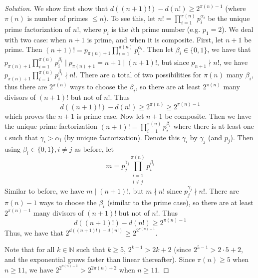 \documentclass{article}
\newcommand{\N}{{\mathbb N}}
\begin{document}
\begin{proof}[Solution]
	We show first show that $d((n+1)!) - d(n!) \geq 2^{\pi(n)-1}$
	(where $\pi(n)$ is number of primes $\leq n$).
	To see this, let $n! = \prod_{i=1}^{\pi(n)}p_i^{\alpha_i}$
	be the unique prime factorization of $n!$,
	where $p_i$ is the $i$th prime number (e.g. $p_1 = 2$).
	We deal with two case: when $n + 1$ is prime, and when it is composite.
	First, let $n + 1$ be prime.
	Then $(n+1)! = p_{\pi(n)+1}\prod_{i=1}^{\pi(n)}p_i^{\alpha_i}$.
	Then let $\beta_i \in \{0,1\}$,
	we have that $p_{\pi(n)+1}\prod_{i=1}^{\pi(n)}p_i^{\beta_i} \mid p_{\pi(n)+1} = n+1 \mid (n+1)!$,
	but since $p_{n+1} \nmid n!$, we have
	$p_{\pi(n)+1}\prod_{i=1}^{\pi(n)}p_i^{\beta_i} \nmid n!$.
	There are a total of two possibilities for $\pi(n)$ many $\beta_i$,
	thus there are $2^{\pi(n)}$ ways to choose the $\beta_i$,
	so there are at least $2^{\pi(n)}$ many divisors of $(n+1)!$
	but not of $n!$.
	Thus
	\[
		d((n+1)!) - d(n!) \geq 2^{\pi(n)} \geq 2^{\pi(n)-1}
	\]
	which proves the $n+1$ is prime case.
	Now let $n+1$ be composite.
	Then we have the unique prime factorization
	$(n+1)! = \prod_{i=1}^{\pi(n)} p_i^{\beta_i}$
	where there is at least one $i$ such that $\gamma_i > \alpha_i$
	(by unique factorization).
	Denote this $\gamma_i$ by $\gamma_j$ (and $p_j$).
	Then using $\beta_i \in \{0,1\}, i\neq j$ as before,
	let
	\[
		m = p_j^{\gamma_j}\prod_{\substack{i=1\\i\neq j}}^{\pi(n)}p_i^{\beta_i}
	\]
	Similar to before, we have $m \mid (n+1)!$, but $m \nmid n!$
	since $p_j^{\gamma_j} \nmid n!$.
	There are $\pi(n)-1$ ways to choose the $\beta_i$ (similar to the prime case),
	so there are at least $2^{\pi(n)-1}$ many divisors of $(n+1)!$
	but not of $n!$.
	Thus
	\[
		d((n+1)!) - d(n!) \geq 2^{\pi(n)-1}
	\]
	Thus, we have that $2^{d((n+1)!) - d(n!)} \geq 2^{2^{\pi(n)-1}}$.

	Note that for all $k \in \N$ such that $k \geq 5$, $2^{k - 1} > 2k + 2$
	(since $2^{5-1} > 2\cdot 5 + 2$,
	and the exponential grows faster than linear thereafter).
	Since $\pi(n) \geq 5$ when $n \geq 11$, we have
	$2^{2^{\pi(n) - 1}} > 2^{2\pi(n) + 2}$ when $n \geq 11$.


\end{proof}
\end{document}
